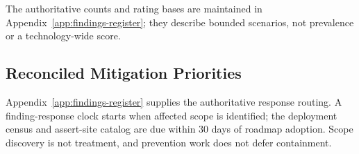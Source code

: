 \documentclass[../main.tex]{subfiles}
\begin{document}
The authoritative counts and rating bases are maintained in
Appendix~\ref{app:findings-register}; they describe bounded scenarios, not
prevalence or a technology-wide score.

\subsection{Reconciled Mitigation Priorities}

Appendix~\ref{app:findings-register} supplies the authoritative response
routing. A finding-response clock starts when affected scope is identified;
the deployment census and assert-site catalog are due within 30 days of roadmap
adoption. Scope discovery is not treatment, and prevention work does not defer
containment.

\iffalse
\begingroup
\small
\setlength{\tabcolsep}{3pt}
\renewcommand{\arraystretch}{1.15}

\setlength{\LTleft}{-0.9in}
\setlength{\LTright}{-0.9in}
\end{document}
